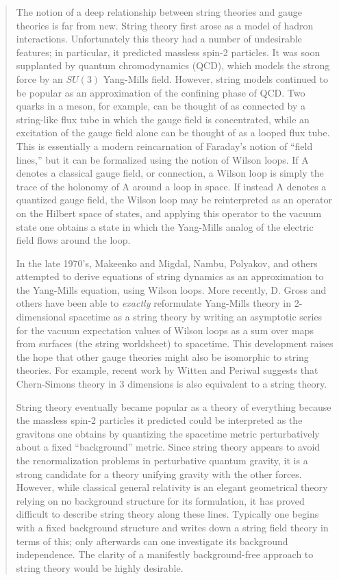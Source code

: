 \documentclass{article}
\begin{document}
\begin{quote}
The notion of a deep relationship between string theories and gauge
theories is far from new. String theory first arose as a model of hadron
interactions. Unfortunately this theory had a number of undesirable
features; in particular, it predicted massless spin-2 particles. It was
soon supplanted by quantum chromodynamics (QCD), which models the strong
force by an \(SU(3)\) Yang-Mills field. However, string models continued
to be popular as an approximation of the confining phase of QCD. Two
quarks in a meson, for example, can be thought of as connected by a
string-like flux tube in which the gauge field is concentrated, while an
excitation of the gauge field alone can be thought of as a looped flux
tube. This is essentially a modern reincarnation of Faraday's notion of
``field lines,'' but it can be formalized using the notion of Wilson
loops. If A denotes a classical gauge field, or connection, a Wilson
loop is simply the trace of the holonomy of A around a loop in space. If
instead A denotes a quantized gauge field, the Wilson loop may be
reinterpreted as an operator on the Hilbert space of states, and
applying this operator to the vacuum state one obtains a state in which
the Yang-Mills analog of the electric field flows around the loop.

In the late 1970's, Makeenko and Migdal, Nambu, Polyakov, and others
attempted to derive equations of string dynamics as an approximation to
the Yang-Mills equation, using Wilson loops. More recently, D. Gross and
others have been able to \emph{exactly} reformulate Yang-Mills theory in
2-dimensional spacetime as a string theory by writing an asymptotic
series for the vacuum expectation values of Wilson loops as a sum over
maps from surfaces (the string worldsheet) to spacetime. This
development raises the hope that other gauge theories might also be
isomorphic to string theories. For example, recent work by Witten and
Periwal suggests that Chern-Simons theory in 3 dimensions is also
equivalent to a string theory.

String theory eventually became popular as a theory of everything
because the massless spin-2 particles it predicted could be interpreted
as the gravitons one obtains by quantizing the spacetime metric
perturbatively about a fixed ``background'' metric. Since string theory
appears to avoid the renormalization problems in perturbative quantum
gravity, it is a strong candidate for a theory unifying gravity with the
other forces. However, while classical general relativity is an elegant
geometrical theory relying on no background structure for its
formulation, it has proved difficult to describe string theory along
these lines. Typically one begins with a fixed background structure and
writes down a string field theory in terms of this; only afterwards can
one investigate its background independence. The clarity of a manifestly
background-free approach to string theory would be highly desirable.


\end{quote}
\end{document}
